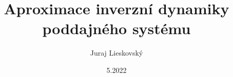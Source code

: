 \documentclass{beamer}
\title{Aproximace inverzní dynamiky poddajného systému}
\author{Juraj Lieskovský}
\institute{ČVUT - ústav mechaniky, biomechaniky a mechatroniky}
\date{5.2022}
\begin{document}
	\frame{\titlepage}

	
	
	
	
\end{document}
